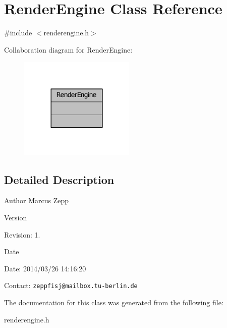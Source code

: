 \section{Render\-Engine Class Reference}
\label{classRenderEngine}


{\ttfamily \#include $<$renderengine.\-h$>$}



Collaboration diagram for Render\-Engine\-:
\nopagebreak
\begin{figure}[H]
\begin{center}
\leavevmode
\includegraphics[width=156pt]{d3/d25/classRenderEngine__coll__graph}
\end{center}
\end{figure}


\subsection{Detailed Description}
\begin{DoxyAuthor}{Author}
Marcus Zepp
\end{DoxyAuthor}
\begin{DoxyVersion}{Version}

\end{DoxyVersion}
\begin{DoxyParagraph}{Revision\-:}
1. 
\end{DoxyParagraph}


\begin{DoxyDate}{Date}

\end{DoxyDate}
\begin{DoxyParagraph}{Date\-:}
2014/03/26 14\-:16\-:20 
\end{DoxyParagraph}


Contact\-: {\tt zeppfisj@mailbox.\-tu-\/berlin.\-de} 

The documentation for this class was generated from the following file\-:\begin{DoxyCompactItemize}
\item 
renderengine.\-h\end{DoxyCompactItemize}
